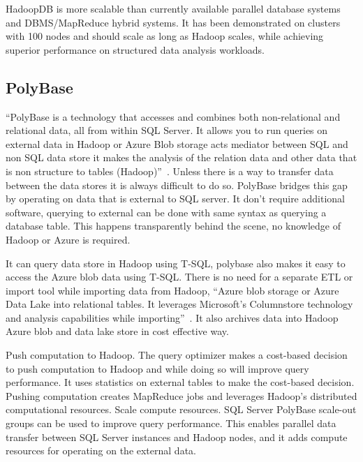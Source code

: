      HadoopDB is more scalable than currently available parallel
     database systems and DBMS/MapReduce hybrid systems. It has been
     demonstrated on clusters with 100 nodes and should scale as long
     as Hadoop scales, while achieving superior performance on
     structured data analysis workloads.
     
\subsection{PolyBase}

``PolyBase is a technology that accesses and combines both
non-relational and relational data, all from within SQL Server. It
allows you to run queries on external data in Hadoop or Azure Blob
storage acts mediator between SQL and non SQL data store it makes the
analysis of the relation data and other data that is non structure to
tables (Hadoop)''~\cite{www-polybase}. Unless there is a way to
transfer data between the data stores it is always difficult to do so.
PolyBase bridges this gap by operating on data that is external to SQL
server. It don't require additional software, querying to external can
be done with same syntax as querying a database table.  This happens
transparently behind the scene, no knowledge of Hadoop or Azure is
required.

It can query data store in Hadoop using T-SQL, polybase also makes it
easy to access the Azure blob data using T-SQL. There is no need for a
separate ETL or import tool while importing data from Hadoop, ``Azure
blob storage or Azure Data Lake into relational tables. It leverages
Microsoft's Columnstore technology and analysis capabilities while
importing''~\cite{www-polybase}. It also archives data into Hadoop
Azure blob and data lake store in cost effective way.

     Push computation to Hadoop. The query optimizer makes a cost-based 
     decision to push computation to Hadoop and while doing so will 
     improve query performance. It uses statistics on external tables 
     to make the cost-based decision. Pushing computation creates 
     MapReduce jobs and leverages Hadoop's distributed computational 
     resources. Scale compute resources. SQL Server PolyBase scale-out 
     groups can be used to improve query performance. This enables parallel 
     data transfer between SQL Server instances and Hadoop nodes, 
     and it adds compute resources for operating on the external data.

     \pv



